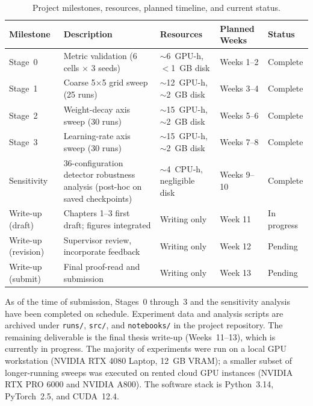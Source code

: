\documentclass[12pt,openany,oneside,a4paper]{book}
\begin{document}
\begin{table}[htbp]
  \centering
  \caption{Project milestones, resources, planned timeline, and current status.}
  \label{tab:milestones}
  \renewcommand{\arraystretch}{1.2}
  \setlength{\tabcolsep}{4pt}
  \small
  \begin{tabular}{p{2.1cm}p{4.6cm}p{3.2cm}p{1.7cm}p{1.5cm}}
    \toprule
    Milestone & Description & Resources & Planned Weeks & Status \\
    \midrule
    Stage~0 & Metric validation (6 cells $\times$ 3 seeds) & $\sim$6~GPU-h, $<$1~GB disk & Weeks 1--2 & Complete \\
    Stage~1 & Coarse 5$\times$5 grid sweep (25 runs) & $\sim$12~GPU-h, $\sim$2~GB disk & Weeks 3--4 & Complete \\
    Stage~2 & Weight-decay axis sweep (30 runs) & $\sim$15~GPU-h, $\sim$2~GB disk & Weeks 5--6 & Complete \\
    Stage~3 & Learning-rate axis sweep (30 runs) & $\sim$15~GPU-h, $\sim$2~GB disk & Weeks 7--8 & Complete \\
    Sensitivity & 36-configuration detector robustness analysis (post-hoc on saved checkpoints) & $\sim$4~CPU-h, negligible disk & Weeks 9--10 & Complete \\
    Write-up (draft) & Chapters 1--3 first draft; figures integrated & Writing only & Week 11 & In progress \\
    Write-up (revision) & Supervisor review, incorporate feedback & Writing only & Week 12 & Pending \\
    Write-up (submit) & Final proof-read and submission & Writing only & Week 13 & Pending \\
    \bottomrule
  \end{tabular}
\end{table}

As of the time of submission, Stages~0 through~3 and the sensitivity
analysis have been completed on schedule.
Experiment data and analysis scripts are archived under
\texttt{runs/}, \texttt{src/}, and \texttt{notebooks/} in the project
repository.
The remaining deliverable is the final thesis write-up
(Weeks~11--13), which is currently in progress.
The majority of experiments were run on a local GPU workstation
(NVIDIA RTX 4080 Laptop, 12~GB VRAM); a smaller subset of
longer-running sweeps was executed on rented cloud GPU instances
(NVIDIA RTX PRO 6000 and NVIDIA A800).
The software stack is Python~3.14, PyTorch~2.5, and CUDA~12.4.
\end{document}
